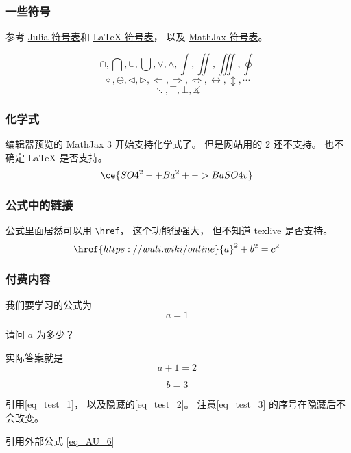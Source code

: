 
\subsubsection{一些符号}

参考 \href{https://docs.julialang.org/en/v1/manual/unicode-input/}{Julia 符号表}和 \href{https://oeis.org/wiki/List_of_LaTeX_mathematical_symbols}{LaTeX 符号表}， 以及 \href{http://www.onemathematicalcat.org/MathJaxDocumentation/TeXSyntax.htm}{MathJax 符号表}。

\begin{equation}
\cap, \bigcap, \cup, \bigcup, \vee, \wedge, \int, \iint, \iiint, \oint~
\end{equation}
\begin{equation}
\diamond, \ominus, \triangleleft, \triangleright, \Longleftarrow, \Longrightarrow, \iff, \leftrightarrow, \updownarrow, \cdots~
\end{equation}
\begin{equation}
\ddots, \top, \bot, \measuredangle~
\end{equation}



\subsubsection{化学式}
编辑器预览的 MathJax 3 开始支持化学式了。 但是网站用的 2 还不支持。 也不确定 LaTeX 是否支持。
\begin{equation}
\ce{SO4^2- + Ba^2+ -> BaSO4 v}~
\end{equation}

\subsubsection{公式中的链接}
公式里面居然可以用 \verb|\href|， 这个功能很强大， 但不知道 texlive 是否支持。
\begin{equation}
\href{https://wuli.wiki/online}{a}^2 + b^2 = c^2~
\end{equation}

\subsubsection{付费内容}
我们要学习的公式为
\begin{equation}\label{eq_test_1}
a = 1~
\end{equation}

\begin{example}{}
请问 $a$ 为多少？
\pay

实际答案就是
\begin{equation}\label{eq_test_2}
a + 1 = 2~
\end{equation}
\paid
\end{example}

\begin{equation}\label{eq_test_3}
b = 3~
\end{equation}


引用\autoref{eq_test_1}， 以及隐藏的\autoref{eq_test_2}。 注意\autoref{eq_test_3} 的序号在隐藏后不会改变。

引用外部公式 \autoref{eq_AU_6}~
